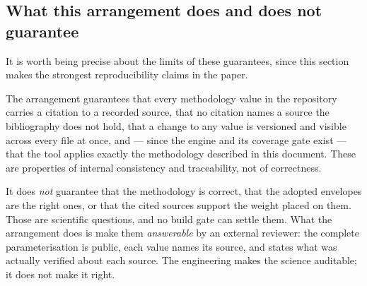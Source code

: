 \subsection{What this arrangement does and does not guarantee}

It is worth being precise about the limits of these guarantees, since this
section makes the strongest reproducibility claims in the paper.

The arrangement guarantees that every methodology value in the repository
carries a citation to a recorded source, that no citation names a source the
bibliography does not hold, that a change to any value is versioned and visible
across every file at once, and --- since the engine and its coverage gate exist
--- that the tool applies exactly the methodology described in this document.
These are properties of internal consistency and traceability, not of
correctness.

It does \emph{not} guarantee that the methodology is correct, that the adopted
envelopes are the right ones, or that the cited sources support the weight
placed on them. Those are scientific questions, and no build gate can settle
them. What the arrangement does is make them \emph{answerable} by an external
reviewer: the complete parameterisation is public, each value names its source,
and  states what was actually verified about each
source. The engineering makes the science auditable; it does not make it right.
